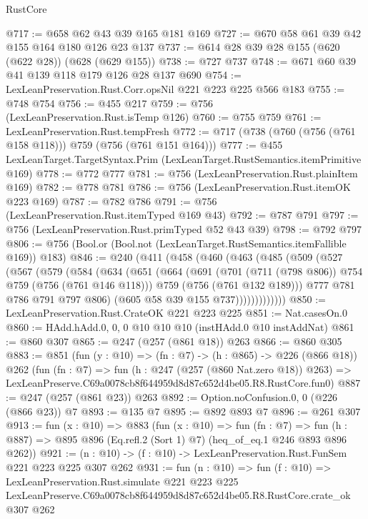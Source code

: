 \begin{lexlean}{RustCore}
\begin{coremodule}
@717 := @658 @62 @43 @39 @165 @181 @169
@727 := @670 @58 @61 @39 @42 @155 @164 @180 @126 @23 @137
@737 := @614 @28 @39 @28 @155 (@620 (@622 @28)) (@628 (@629 @155))
@738 := @727 @737
@748 := @671 @60 @39 @41 @139 @118 @179 @126 @28 @137 @690
@754 := LexLeanPreservation.Rust.Corr.opsNil @221 @223 @225 @566 @183
@755 := @748 @754
@756 := @455 @217
@759 := @756 (LexLeanPreservation.Rust.isTemp @126)
@760 := @755 @759
@761 := LexLeanPreservation.Rust.tempFresh
@772 := @717 (@738 (@760 (@756 (@761 @158 @118))) @759 (@756 (@761 @151 @164)))
@777 := @455 LexLeanTarget.TargetSyntax.Prim (LexLeanTarget.RustSemantics.itemPrimitive @169)
@778 := @772 @777
@781 := @756 (LexLeanPreservation.Rust.plainItem @169)
@782 := @778 @781
@786 := @756 (LexLeanPreservation.Rust.itemOK @223 @169)
@787 := @782 @786
@791 := @756 (LexLeanPreservation.Rust.itemTyped @169 @43)
@792 := @787 @791
@797 := @756 (LexLeanPreservation.Rust.primTyped @52 @43 @39)
@798 := @792 @797
@806 := @756 (Bool.or (Bool.not (LexLeanTarget.RustSemantics.itemFallible @169)) @183)
@846 := @240
    (@411
      (@458
        (@460
          (@463
            (@485
              (@509
                (@527
                  (@567
                    (@579
                      (@584
                        (@634
                          (@651
                            (@664
                              (@691
                                (@701 (@711 (@798 @806)) @754 @759 (@756 (@761 @146 @118)))
                                @759
                                (@756 (@761 @132 @189)))
                              @777
                              @781
                              @786
                              @791
                              @797
                              @806)
                            (@605 @58 @39 @155 @737)))))))))))))
@850 := LexLeanPreservation.Rust.CrateOK @221 @223 @225
@851 := Nat.casesOn.{0}
@860 := HAdd.hAdd.{0, 0, 0} @10 @10 @10 (instHAdd.{0} @10 instAddNat)
@861 := @860 @307
@865 := @247 (@257 (@861 @18)) @263
@866 := @860 @305
@883 := @851
    (fun (y : @10) => (fn : @7) -> (h : @865) -> @226 (@866 @18))
    @262
    (fun (fn : @7) =>
    fun (h : @247 (@257 (@860 Nat.zero @18)) @263) =>
    LexLeanPreserve.C69a0078cb8f644959d8d87c652d4be05.R8.RustCore.fun0)
@887 := @247 (@257 (@861 @23)) @263
@892 := Option.noConfusion.{0, 0} (@226 (@866 @23)) @7
@893 := @135 @7
@895 := @892 @893 @7
@896 := @261 @307
@913 := fun (x : @10) =>
  @883
    (fun (x : @10) =>
    fun (fn : @7) =>
    fun (h : @887) => @895 @896 (Eq.refl.{2} (Sort 1) @7) (heq_of_eq.{1} @246 @893 @896 @262))
@921 := (n : @10) -> (f : @10) -> LexLeanPreservation.Rust.FunSem @221 @223 @225 @307 @262
@931 := fun (n : @10) =>
  fun (f : @10) =>
  LexLeanPreservation.Rust.simulate
    @221
    @223
    @225
    LexLeanPreserve.C69a0078cb8f644959d8d87c652d4be05.R8.RustCore.crate_ok
    @307
    @262
\end{coremodule}
\end{lexlean}
